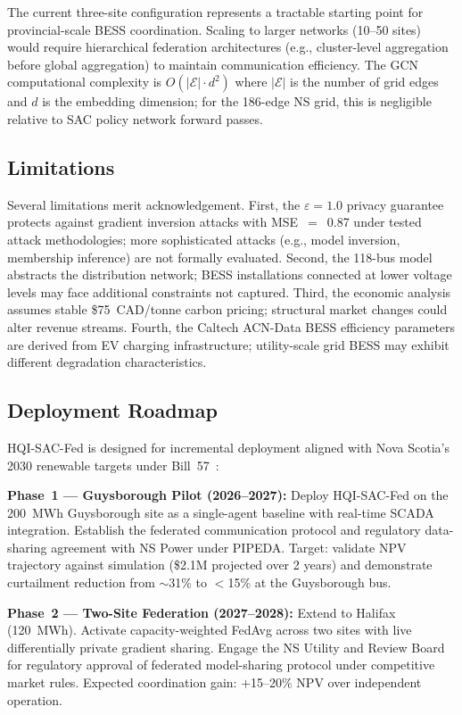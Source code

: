 \documentclass[journal]{IEEEtran}
\begin{document}
The current three-site configuration represents a tractable starting
point for provincial-scale BESS coordination. Scaling to larger
networks (10--50 sites) would require hierarchical federation
architectures (e.g., cluster-level aggregation before global
aggregation) to maintain communication efficiency. The GCN
computational complexity is $O(|\mathcal{E}|\cdot d^2)$ where
$|\mathcal{E}|$ is the number of grid edges and $d$ is the embedding
dimension; for the 186-edge NS grid, this is negligible relative to
SAC policy network forward passes.

\subsection{Limitations}

Several limitations merit acknowledgement. First, the
$\varepsilon = 1.0$ privacy guarantee protects against gradient
inversion attacks with MSE~$=$~0.87 under tested attack
methodologies; more sophisticated attacks (e.g., model inversion,
membership inference) are not formally evaluated. Second, the 118-bus
model abstracts the distribution network; BESS installations connected
at lower voltage levels may face additional constraints not captured.
Third, the economic analysis assumes stable \$75~CAD/tonne carbon
pricing; structural market changes could alter revenue streams.
Fourth, the Caltech ACN-Data BESS efficiency parameters are derived
from EV charging infrastructure; utility-scale grid BESS may exhibit
different degradation characteristics.

\subsection{Deployment Roadmap}
\label{sec:deployment}

HQI-SAC-Fed is designed for incremental deployment aligned with Nova
Scotia's 2030 renewable targets under Bill~57~\cite{nsbill57}:

\textbf{Phase~1 --- Guysborough Pilot (2026--2027):} Deploy
HQI-SAC-Fed on the 200~MWh Guysborough site as a single-agent
baseline with real-time SCADA integration. Establish the federated
communication protocol and regulatory data-sharing agreement with NS
Power under PIPEDA. Target: validate NPV trajectory against simulation
(\$2.1M projected over 2 years) and demonstrate curtailment reduction
from $\sim$31\% to $<$15\% at the Guysborough bus.

\textbf{Phase~2 --- Two-Site Federation (2027--2028):} Extend to
Halifax (120~MWh). Activate capacity-weighted FedAvg across two sites
with live differentially private gradient sharing. Engage the NS
Utility and Review Board for regulatory approval of federated
model-sharing protocol under competitive market rules. Expected
coordination gain: $+$15--20\% NPV over independent operation.
\end{document}
